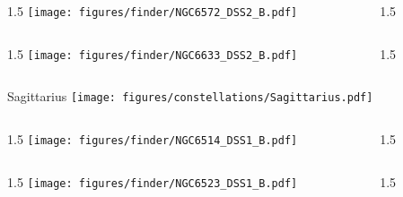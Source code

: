 \documentclass[final]{beamer}
\newlength{\colwidth}
\begin{document}

\begin{frame}[t]{}
  \begin{columns}[T]
    \begin{column}{1.5\colwidth}
      \centering
      \texttt{[image: figures/finder/NGC6572\_DSS2\_B.pdf]}
    \end{column}
    \begin{column}{1.5\colwidth}
      \Large
      
    \end{column}
  \end{columns}
  \vspace{\fill}
  \begin{columns}[T]
    \begin{column}{1.5\colwidth}
      \centering
      \texttt{[image: figures/finder/NGC6633\_DSS2\_B.pdf]}
    \end{column}
    \begin{column}{1.5\colwidth}
      \Large
      
    \end{column}
  \end{columns}
\end{frame}


\begin{frame}[t]{\LARGE Sagittarius}
  \centering
  \texttt{[image: figures/constellations/Sagittarius.pdf]}
\end{frame}


\begin{frame}[t]{}
  \begin{columns}[T]
    \begin{column}{1.5\colwidth}
      \centering
      \texttt{[image: figures/finder/NGC6514\_DSS1\_B.pdf]}
    \end{column}
    \begin{column}{1.5\colwidth}
      \Large
      
    \end{column}
  \end{columns}
  \vspace{\fill}
  \begin{columns}[T]
    \begin{column}{1.5\colwidth}
      \centering
      \texttt{[image: figures/finder/NGC6523\_DSS1\_B.pdf]}
    \end{column}
    \begin{column}{1.5\colwidth}
      \Large
      
    \end{column}
  \end{columns}
\end{frame}
\end{document}
